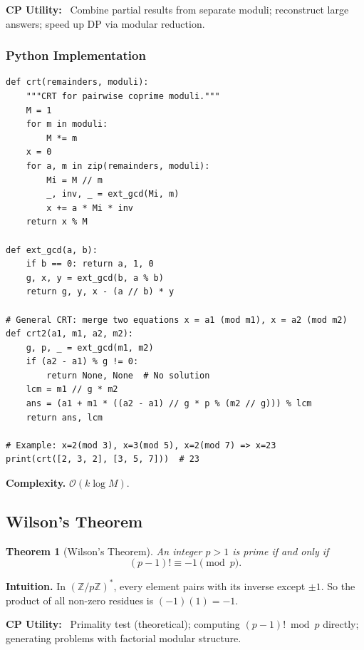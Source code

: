 \documentclass[10pt,a4paper]{article}
\theoremstyle{cpstyle}
\newtheorem{theorem}{Theorem}[section]
\newenvironment{cputility}{%
  \begin{mdframed}[backgroundcolor=theorembg, linecolor=accent!50, linewidth=1pt,
    innerleftmargin=10pt, innerrightmargin=10pt, innertopmargin=6pt, innerbottommargin=6pt]
  \textbf{\color{accent}CP Utility:}~}{%
  \end{mdframed}}
\newcommand{\bigO}[1]{\mathcal{O}\!\left(#1\right)}
\newcommand{\Z}{\mathbb{Z}}
\begin{document}
\begin{cputility}
Combine partial results from separate moduli; reconstruct large answers; speed up DP via modular reduction.
\end{cputility}

\subsubsection{Python Implementation}
\begin{lstlisting}[caption={CRT -- pairwise coprime and general version}]
def crt(remainders, moduli):
    """CRT for pairwise coprime moduli."""
    M = 1
    for m in moduli:
        M *= m
    x = 0
    for a, m in zip(remainders, moduli):
        Mi = M // m
        _, inv, _ = ext_gcd(Mi, m)
        x += a * Mi * inv
    return x % M

def ext_gcd(a, b):
    if b == 0: return a, 1, 0
    g, x, y = ext_gcd(b, a % b)
    return g, y, x - (a // b) * y

# General CRT: merge two equations x = a1 (mod m1), x = a2 (mod m2)
def crt2(a1, m1, a2, m2):
    g, p, _ = ext_gcd(m1, m2)
    if (a2 - a1) % g != 0:
        return None, None  # No solution
    lcm = m1 // g * m2
    ans = (a1 + m1 * ((a2 - a1) // g * p % (m2 // g))) % lcm
    return ans, lcm

# Example: x=2(mod 3), x=3(mod 5), x=2(mod 7) => x=23
print(crt([2, 3, 2], [3, 5, 7]))  # 23
\end{lstlisting}

\textbf{Complexity.} $\bigO{k \log M}$.

\subsection{Wilson's Theorem}

\begin{theorem}[Wilson's Theorem]
An integer $p > 1$ is prime if and only if
\[
  (p-1)! \equiv -1 \pmod{p}.
\]
\end{theorem}

\textbf{Intuition.} In $(\Z/p\Z)^*$, every element pairs with its inverse except $\pm 1$. So the product of all non-zero residues is $(-1)(1) = -1$.

\begin{cputility}
Primality test (theoretical); computing $(p-1)! \bmod p$ directly; generating problems with factorial modular structure.
\end{cputility}
\end{document}
